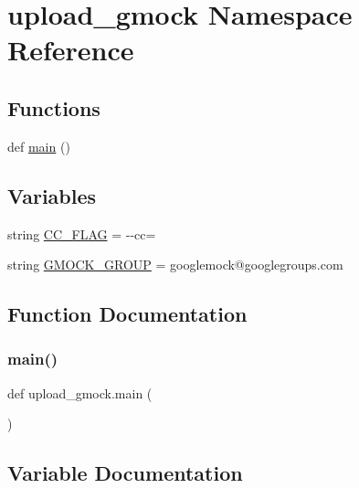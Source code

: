 \hypertarget{namespaceupload__gmock}{}\section{upload\+\_\+gmock Namespace Reference}
\label{namespaceupload__gmock}
\subsection*{Functions}
\begin{DoxyCompactItemize}
\item 
def \mbox{\hyperlink{namespaceupload__gmock_aea9cb062f9294622c32e54eb937f588e}{main}} ()
\end{DoxyCompactItemize}
\subsection*{Variables}
\begin{DoxyCompactItemize}
\item 
string \mbox{\hyperlink{namespaceupload__gmock_a463de67b37725c16ba31c5d4702e15b8}{C\+C\+\_\+\+F\+L\+AG}} = \textquotesingle{}-\/-\/cc=\textquotesingle{}
\item 
string \mbox{\hyperlink{namespaceupload__gmock_acf8fe60647d8c3748b0e22dcf669efee}{G\+M\+O\+C\+K\+\_\+\+G\+R\+O\+UP}} = \textquotesingle{}googlemock@googlegroups.\+com\textquotesingle{}
\end{DoxyCompactItemize}


\subsection{Function Documentation}
\mbox{\label{namespaceupload__gmock_aea9cb062f9294622c32e54eb937f588e}} 
\subsubsection{\texorpdfstring{main()}{main()}}
{\footnotesize\ttfamily def upload\+\_\+gmock.\+main (\begin{DoxyParamCaption}{ }\end{DoxyParamCaption})}



\subsection{Variable Documentation}
\mbox{\label{namespaceupload__gmock_a463de67b37725c16ba31c5d4702e15b8}} 
